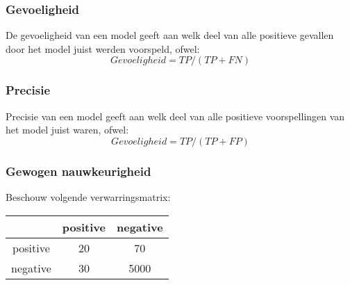 \subsubsection{Gevoeligheid}
De gevoeligheid van een model geeft aan welk deel van alle positieve gevallen door het model juist werden voorspeld, ofwel: 
\[Gevoeligheid = TP / (TP + FN) \]

\subsubsection{Precisie}
Precisie van een model geeft aan welk deel van alle positieve voorspellingen van het model juist waren, ofwel: 
\[Gevoeligheid = TP / (TP + FP) \]

\subsubsection{Gewogen nauwkeurigheid}
Beschouw volgende verwarringsmatrix: 
\begin{center}
\begin{tabular} {|c | c | c |}
\hline
& positive & negative \\
\hline
positive & 20 & 70 \\
\hline
negative & 30  & 5000 \\
\hline
\end{tabular}
\end{center}

